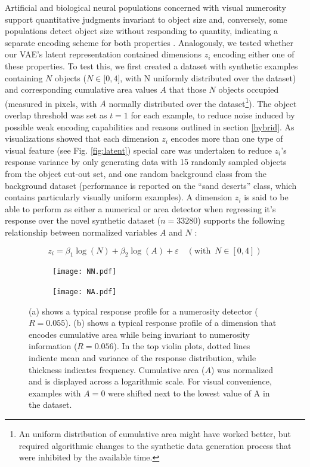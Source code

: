 \documentclass[twocolumn]{article}
\begin{document}
Artificial and biological neural populations concerned with visual
numerosity support quantitative judgments invariant to object size and,
conversely, some populations detect object size without responding to
quantity, indicating a separate encoding scheme for both properties
\citep{stoianov2012, harvey2013topographic}. Analogously, we tested
whether our VAE's latent representation contained dimensions \(z_i\)
encoding either one of these properties. To test this, we first created
a dataset with synthetic examples containing \(N\) objects
(\(N \in \lbrack 0, 4\rbrack\), with N uniformly distributed over the
dataset) and corresponding cumulative area values \(A\) that those \(N\)
objects occupied (measured in pixels, with \(A\) normally distributed
over the dataset\footnote{An uniform distribution of cumulative area
  might have worked better, but required algorithmic changes to the
  synthetic data generation process that were inhibited by the available time.}). The object overlap threshold was set as $t=1$ for
each example, to reduce noise induced by possible weak encoding
capabilities and reasons outlined in section
\ref{hybrid}. As visualizations showed that each dimension \(z_i\) encodes more
than one type of visual feature (see Fig. \ref{fig:latent}) special care was
undertaken to reduce \(z_i\)'s response variance by only generating data
with 15 randomly sampled objects from the object cut-out set, and one
random background class from the background dataset (performance is
reported on the ``sand deserts'' class, which contains particularly
visually uniform examples). A dimension \(z_i\) is said to be able to
perform as either a numerical or area detector when regressing it's
response over the novel synthetic dataset (\(n=33280\)) supports the
following relationship between normalized variables \(A\) and \(N\)
\citep{stoianov2012}:

\[z_i = \beta_1 \log(N) + \beta_2\log(A) + \varepsilon \quad (\textrm{with }\, N \in [0, 4]) \tag{2} \]

\begin{figure}[ht]
\centering
\begin{subfigure}{.5\textwidth}
  \centering
  \texttt{[image: NN.pdf]}
  \caption{}
  \label{fig:zn}
\end{subfigure}%
\begin{subfigure}{.5\textwidth}
  \centering
  \texttt{[image: NA.pdf]}
   \caption{}
  \label{fig:za}
\end{subfigure}
\caption{(a) shows a typical response profile for a numerosity detector ($R=0.055$).  (b) shows a typical response profile of a dimension that encodes cumulative area while being invariant to numerosity information ($R=0.056$). In the top violin plots, dotted lines indicate mean and variance of the response distribution, while thickness indicates frequency. Cumulative area ($A$) was normalized and is displayed across a logarithmic scale. For visual convenience, examples with $A=0$ were shifted next to the lowest value of A in the dataset.}
\label{fig:linear}
\end{figure}
\end{document}
